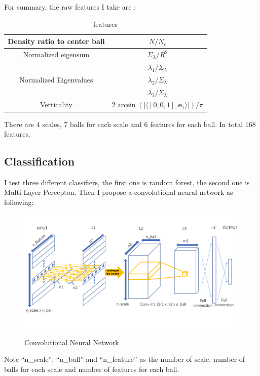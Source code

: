 \documentclass{article}
\begin{document}
For summary, the raw features I take are : 
\begin{table}[h!]
	\centering
	\begin{tabular}{| c | c |} 
		\hline
		Density ratio to center ball & $N / N_c$\\
		\hline
		Normalized eigensum & ${\Sigma_\lambda}/{R^2}$ \\ 
		\hline
		\multirow{3}{*}{Normalized Eigenvalues}
		& $\lambda_1/\Sigma_\lambda$ \\
		& $\lambda_2/\Sigma_\lambda$ \\
		& $\lambda_3/\Sigma_\lambda$ \\
		\hline
		Verticality & $2\arcsin(|\langle [0,0,1], \mathbf{e}_1\rangle|) / \pi$\\
		\hline
	\end{tabular}
	\caption{features}
	\label{table:2}
\end{table}

There are 4 scales, 7 balls for each scale and 6 features for each ball. In total 168 features.


\subsection{Classification}
I test three different classifiers, the first one is random forest, the second one is Multi-Layer Percepton. Then I propose a convolutional neural network as following:

\begin{figure}[h]
	\centering
	\includegraphics[width=12cm]{cnn.png}
	\caption{Convolutional Neural Network}
	\label{fig:cnn}
\end{figure}

Note ``n\_scale'', ``n\_ball'' and ``n\_feature'' as the number of scale, number of balls for each scale and number of features for each ball. 
\end{document}
